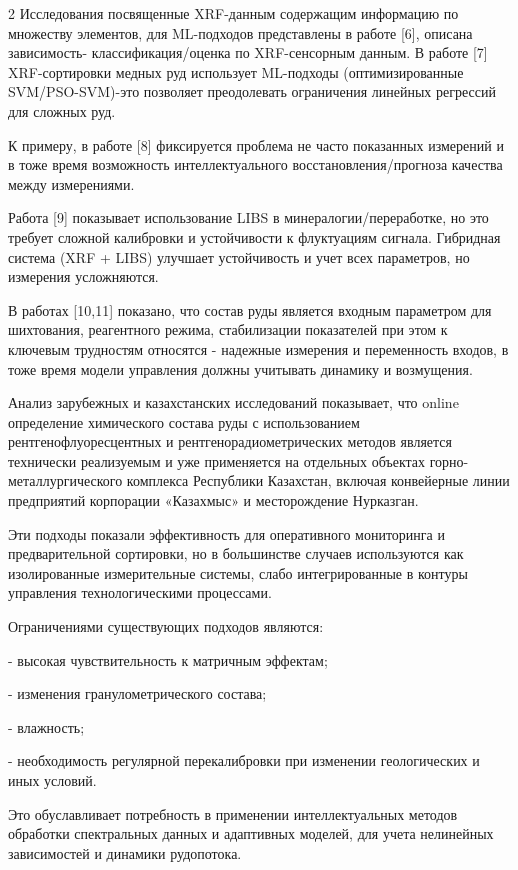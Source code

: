 \begin{multicols}{2}
Исследования посвященные XRF-данным содержащим информацию по множеству
элементов, для ML-подходов представлены в работе {[}6{]}, описана
зависимость- классификация/оценка по XRF-сенсорным данным. В работе
{[}7{]} XRF-сортировки медных руд использует ML-подходы
(оптимизированные SVM/PSO-SVM)-это позволяет преодолевать ограничения
линейных регрессий для сложных руд.

К примеру, в работе {[}8{]} фиксируется проблема не часто показанных
измерений и в тоже время возможность интеллектуального
восстановления/прогноза качества между измерениями.

Работа {[}9{]} показывает использование LIBS в минералогии/переработке,
но это требует сложной калибровки и устойчивости к флуктуациям сигнала.
Гибридная система (XRF + LIBS) улучшает устойчивость и учет всех
параметров, но измерения усложняются.

В работах {[}10,11{]} показано, что состав руды является входным
параметром для шихтования, реагентного режима, стабилизации показателей
при этом к ключевым трудностям относятся - надежные измерения и
переменность входов, в тоже время модели управления должны учитывать
динамику и возмущения.

Анализ зарубежных и казахстанских исследований показывает, что online
определение химического состава руды с использованием
рентгенофлуоресцентных и рентгенорадиометрических методов является
технически реализуемым и уже применяется на отдельных объектах
горно-металлургического комплекса Республики Казахстан, включая
конвейерные линии предприятий корпорации «Казахмыс» и месторождение
Нурказган.

Эти подходы показали эффективность для оперативного мониторинга и
предварительной сортировки, но в большинстве случаев используются как
изолированные измерительные системы, слабо интегрированные в контуры
управления технологическими процессами.

Ограничениями существующих подходов являются:

- высокая чувствительность к матричным эффектам;

- изменения гранулометрического состава;

- влажность;

- необходимость регулярной перекалибровки при изменении геологических и
иных условий.

Это обуславливает потребность в применении интеллектуальных методов
обработки спектральных данных и адаптивных моделей, для учета нелинейных
зависимостей и динамики рудопотока.


\end{multicols}
